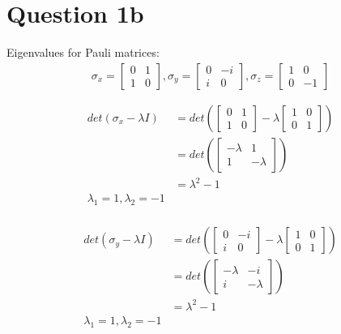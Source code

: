 \documentclass[12pt]{article}
\begin{document}
\section*{Question 1b}
Eigenvalues for Pauli matrices: \\
\begin{equation}
    \begin{split}
        \sigma_x = \begin{bmatrix} 0 & 1 \\ 1 & 0 \end{bmatrix}, \sigma_y = \begin{bmatrix} 0 & -i \\ i & 0 \end{bmatrix}, \sigma_z = \begin{bmatrix} 1 & 0 \\ 0 & -1 \end{bmatrix} \\\\
    \end{split}
\end{equation}
\begin{equation}
    \begin{split}
        det(\sigma_x - \lambda I) &= det\left(\begin{bmatrix} 0 & 1 \\ 1 & 0 \end{bmatrix} - \lambda \begin{bmatrix} 1 & 0 \\ 0 & 1 \end{bmatrix}\right) \\
        &= det\left(\begin{bmatrix} - \lambda & 1 \\ 1 & - \lambda \end{bmatrix}\right) \\
        &= \lambda^2 - 1\\
        \lambda_1 = 1, \lambda_2 = -1 \\
        \end{split}
\end{equation}

\begin{equation}
    \begin{split}
        det(\sigma_y - \lambda I) &= det\left(\begin{bmatrix} 0 & -i \\ i & 0 \end{bmatrix} - \lambda \begin{bmatrix} 1 & 0 \\ 0 & 1 \end{bmatrix}\right) \\
        &= det\left(\begin{bmatrix} - \lambda & -i \\ i & - \lambda \end{bmatrix}\right) \\
        &= \lambda^2 - 1 \\
        \lambda_1 = 1, \lambda_2 = -1\\
    \end{split}
\end{equation}
\end{document}
